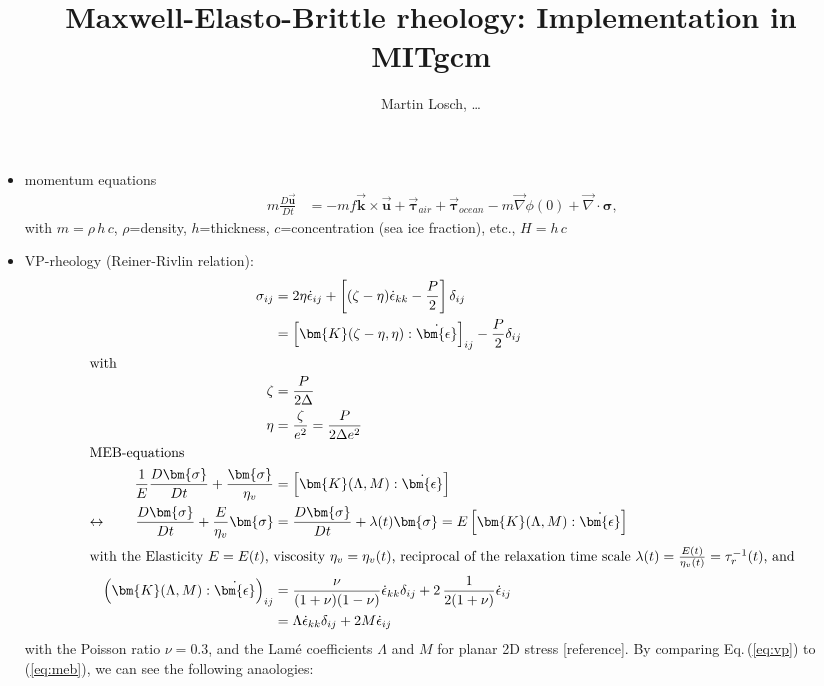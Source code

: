 \documentclass[12pt]{article}
\title{Maxwell-Elasto-Brittle rheology: Implementation in MITgcm}
\author{Martin Losch, \ldots}
\newcommand{\vek}[1]{\ensuremath{\vec{\bm{#1}}}}
\newcommand{\vtau}{\vek{\bm{\tau}}}
\newcommand{\sr}{\dot{\epsilon}}
\newcommand{\srb}{\dot{\bm{\epsilon}}}
\begin{document}
\maketitle

\begin{itemize}
\item momentum equations
  \begin{align}
  \label{eq:momseaice}
  m \frac{D\vek{u}}{Dt} &= -mf\vek{k}\times\vek{u} + \vtau_{air} +
  \vtau_{ocean} - m \vec{\nabla}{\phi(0)} + \vec{\nabla}\cdot\bm{\sigma},
  \end{align}
  with $m=\rho\,h\,c$, $\rho$=density, $h$=thickness, $c$=concentration (sea ice fraction), etc., $H=h\,c$
\item VP-rheology (Reiner-Rivlin relation):
  \begin{align}
    \label{eq:vp}\sigma_{ij} &= 2 \eta \sr_{ij} +\left[(\zeta-\eta)\sr_{kk}-\frac{P}{2}\right]\delta_{ij}\\
                             &= \left[\bm{K}(\zeta-\eta,\eta):\srb
                               \right]_{ij} - \frac{P}{2}\delta_{ij}\\
    \intertext{with}
    \zeta &= \frac{P}{2\Delta} \\
    \eta &= \frac{\zeta}{e^2} = \frac{P}{2\Delta e^2} \\
    \intertext{MEB-equations}
    \frac{1}{E}\frac{D\bm{\sigma}}{Dt} + \frac{\bm{\sigma}}{\eta_{v}}
                &= \left[\bm{K}(\Lambda,M):\srb\right] \\
    \leftrightarrow \qquad
    \frac{D\bm{\sigma}}{Dt} + \frac{E}{\eta_{v}}\bm{\sigma}
                &= \frac{D\bm{\sigma}}{Dt} + \lambda(t)\bm{\sigma}
                  = E\left[\bm{K}(\Lambda,M):\srb\right] \\
    \intertext{with the Elasticity $E=E(t)$, viscosity $\eta_{v}=\eta_{v}(t)$, reciprocal of the relaxation time scale $\lambda(t)=\frac{E(t)}{\eta_{v}(t)} = \tau_r^{-1}(t)$, and}
    \label{eq:meb}\left(\bm{K}(\Lambda,M):\srb\right)_{ij}
                &= \frac{\nu}{(1+\nu)(1-\nu)}\sr_{kk}\delta_{ij}
                  + 2\,\frac{1}{2(1+\nu)}\sr_{ij} \\
                & = \Lambda\sr_{kk}\delta_{ij} +
                  2M\sr_{ij} \\
  \end{align}
  with the Poisson ratio $\nu = 0.3$, and the Lam{\'e} coefficients $\Lambda$ and $M$ for planar 2D stress [reference]. By comparing Eq.\,(\ref{eq:vp}) to (\ref{eq:meb}), we can see the following anaologies:

\end{itemize}
\end{document}
